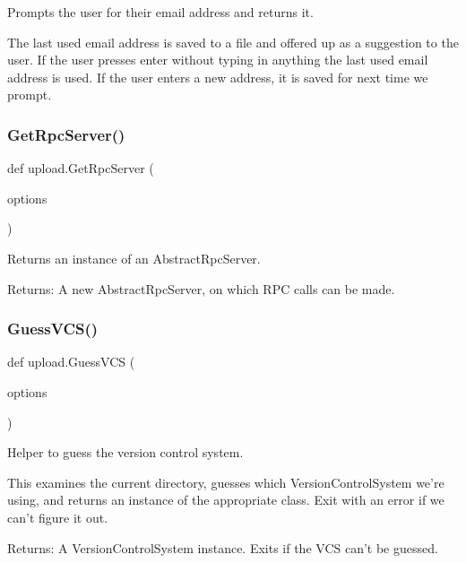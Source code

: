 \begin{DoxyVerb}Prompts the user for their email address and returns it.

The last used email address is saved to a file and offered up as a suggestion
to the user. If the user presses enter without typing in anything the last
used email address is used. If the user enters a new address, it is saved
for next time we prompt.\end{DoxyVerb}
 \mbox{\label{namespaceupload_a1dadef480a702dbc5d0fb66203b9abe7}} 
\subsubsection{\texorpdfstring{Get\+Rpc\+Server()}{GetRpcServer()}}
{\footnotesize\ttfamily def upload.\+Get\+Rpc\+Server (\begin{DoxyParamCaption}\item[{}]{options }\end{DoxyParamCaption})}

\begin{DoxyVerb}Returns an instance of an AbstractRpcServer.

Returns:
  A new AbstractRpcServer, on which RPC calls can be made.
\end{DoxyVerb}
 \mbox{\label{namespaceupload_a31390568253accd22ee51861eaeb99bd}} 
\subsubsection{\texorpdfstring{Guess\+V\+C\+S()}{GuessVCS()}}
{\footnotesize\ttfamily def upload.\+Guess\+V\+CS (\begin{DoxyParamCaption}\item[{}]{options }\end{DoxyParamCaption})}

\begin{DoxyVerb}Helper to guess the version control system.

This examines the current directory, guesses which VersionControlSystem
we're using, and returns an instance of the appropriate class.  Exit with an
error if we can't figure it out.

Returns:
  A VersionControlSystem instance. Exits if the VCS can't be guessed.
\end{DoxyVerb}
 \mbox{\label{namespaceupload_aef3fcf7a8d77d13ba75adbf58b6c43ee}} 
